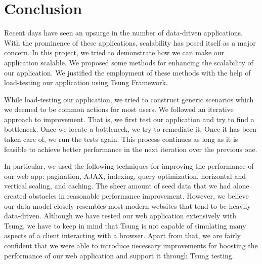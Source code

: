 \chapter{Conclusion}
Recent days have seen an upsurge in the number of data-driven applications. With the prominence of these applications, scalability has posed itself as a major concern. In this project, we tried to demonstrate how we can make our application scalable. We proposed some methods for enhancing the scalability of our application. We justified the employment of these methods with the help of load-testing our application using Tsung Framework.

While load-testing our application, we tried to construct generic scenarios which we deemed to be common actions for most users. We followed an iterative approach to improvement. That is, we first test our application and try to find a bottleneck. Once we locate a bottleneck, we try to remediate it. Once it has been taken care of, we run the tests again. This process continues as long as it is feasible to achieve better performance in the next iteration over the previous one.

In particular, we used the following techniques for improving the performance of our web app: pagination, AJAX, indexing, query optimization, horizontal and vertical scaling, and caching. The sheer amount of seed data that we had alone created obstacles in reasonable performance improvement. However, we believe our data model closely resembles most modern websites that tend to be heavily data-driven. Although we have tested our web application extensively with Tsung, we have to keep in mind that Tsung is not capable of simulating many aspects of a client interacting with a browser. Apart from that, we are fairly confident that we were able to introduce necessary improvements for boosting the performance of our web application and support it through Tsung testing.
